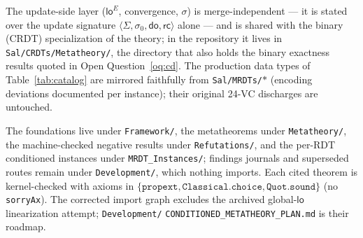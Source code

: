 \documentclass[11pt]{article}
\newcommand{\rcrel}{\mathsf{rc}}                 %
\newcommand{\Sinit}{\sigma_0}
\newcommand{\loE}[1]{\mathsf{lo}^{#1}}
\newcommand{\lean}[1]{\texttt{#1}}
\begin{document}
The update-side layer ($\loE{E}$, convergence, $\sigma$) is
merge-independent --- it is stated over the update signature
$\langle \Sigma, \Sinit, \mathsf{do}, \rcrel\rangle$ alone --- and
is shared with the binary
(CRDT) specialization of the theory; in the repository it lives in
\lean{Sal/CRDTs/Metatheory/}, the directory that also holds the binary
exactness results quoted in Open Question~\ref{oq:cd}. The production
data types of Table~\ref{tab:catalog} are
mirrored faithfully from \lean{Sal/MRDTs/}$\ast$ (encoding deviations
documented per instance); their original 24-VC discharges are untouched.

The foundations live under \lean{Framework/}, the metatheorems under
\lean{Metatheory/}, the machine-checked negative results under
\lean{Refutations/}, and the per-RDT conditioned instances under
\lean{MRDT\_Instances/}; findings journals and superseded
routes remain under \lean{Development/}, which nothing imports. Each cited theorem is kernel-checked
with axioms in $\{\lean{propext},
\lean{Classical.choice}, \lean{Quot.sound}\}$ (no \lean{sorryAx}). The
corrected import graph excludes the archived global-$\mathsf{lo}$
linearization attempt; \lean{Development/}%
\lean{CONDITIONED\_METATHEORY\_PLAN.md} is their roadmap.

\fi\fi
\end{document}
